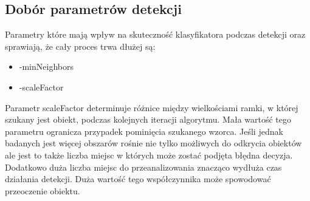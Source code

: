 \documentclass{article}
\numberwithin{equation}{section}
\begin{document}
\subsection{Dobór parametrów detekcji}

Parametry które mają wpływ na skuteczność klasyfikatora podczas detekcji oraz sprawiają, że cały proces trwa dłużej są:
\begin{itemize}
    \item -minNeighbors
    \item -scaleFactor
\end{itemize}

Parametr scaleFactor determinuje różnice między wielkościami ramki, w której szukany jest obiekt, podczas kolejnych iteracji algorytmu. Mała wartość tego parametru ogranicza przypadek pominięcia szukanego wzorca. Jeśli jednak badanych jest więcej obszarów rośnie nie tylko możliwych do odkrycia obiektów ale jest to także liczba miejsc w których może zostać podjęta błędna decyzja. Dodatkowo duża liczba miejsc do przeanalizowania znacząco wydłuża czas działania detekcji. Duża wartość tego współczynnika może spowodować przeoczenie obiektu.
\end{document}
